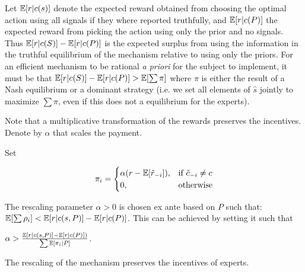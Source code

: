 Let $\operatorname*{\mathbb E}[r|c(s)]$ denote the expected reward obtained from choosing the optimal action using all signals if they where reported truthfully, and $\operatorname*{\mathbb E}[r|c(P)] $ the expected reward from picking the action using only the prior and no signals. Thus $\operatorname*{\mathbb E}[r|c(S)] - \operatorname*{\mathbb E}[r|c(P)] $ is the expected surplus from using the information in the truthful equilibrium of the mechanism relative to using only the priors. For an efficient mechanism to be rational \emph{a priori} for the subject to implement, it must be that $\operatorname*{\mathbb E}[r|c(S)] - \operatorname*{\mathbb E}[r|c(P)] > \operatorname*{\mathbb E}[\sum \pi]$ where $\pi$ is either the result of a Nash equilibrium or a dominant strategy (i.e. we set all elements of $\hat{s}$ jointly to maximize $\sum \pi$, even if this does not a equilibrium for the experts).

Note that a multiplicative transformation of the rewards preserves the incentives. Denote by $\alpha$ that scales the payment.

\begin{mech}
Set

\[
    \pi_i = 
\begin{cases}
    \alpha (r - \expec[\hat{r}_{-i}] ),& \text{if } \hat{c}_{-i} \neq c\\
    0,              & \text{otherwise}
\end{cases}
\]

The rescaling parameter $\alpha>0$ is chosen ex ante based on $P$ such that: $ \operatorname*{\mathbb E}[\sum \rho_i] < \operatorname*{\mathbb E}[r|c(s,P)] - \operatorname*{\mathbb E}[r|c(P)] $. This can be achieved by setting it such that

 $\alpha >   \frac{\operatorname*{\mathbb E}[r|c(s,P)] - \operatorname*{\mathbb E}[r|c(P)] )}{\sum \operatorname*{\mathbb E}[\pi_i|P] }  $. 

\end{mech}



\begin{lem}
	The rescaling of the mechanism preserves the incentives of experts.
\end{lem}

